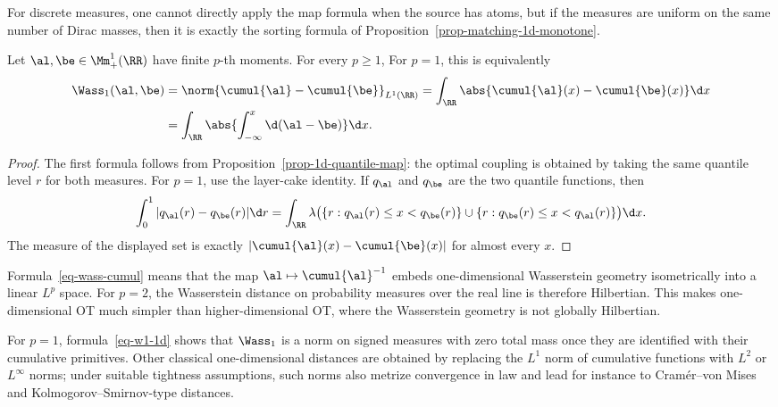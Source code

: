 For discrete measures, one cannot directly apply the map formula when the source has atoms, but if the measures are uniform on the same number of Dirac masses, then it is exactly the sorting formula of Proposition~\ref{prop-matching-1d-monotone}.

\begin{prop}\label{prop-wass-quantile-1d}
	Let $\al,\be\in\Mm_+^1(\RR)$ have finite $p$-th moments. For every $p\geq1$,
	For $p=1$, this is equivalently
	\begin{align}\label{eq-w1-1d}
		\Wass_1(\al,\be)
		&=
		\norm{\cumul{\al}-\cumul{\be}}_{L^1(\RR)}
		=
		\int_\RR \abs{\cumul{\al}(x)-\cumul{\be}(x)}\d x \\
		&=
		\int_\RR \abs{\int_{-\infty}^x\d(\al-\be)}\d x.
	\end{align}
\end{prop}
\begin{proof}
	The first formula follows from Proposition~\ref{prop-1d-quantile-map}: the optimal coupling is obtained by taking the same quantile level $r$ for both measures. For $p=1$, use the layer-cake identity. If $q_\al$ and $q_\be$ are the two quantile functions, then
	\[
		\int_0^1 |q_\al(r)-q_\be(r)|\d r
		=
		\int_\RR
		\lambda\bigl(\{r:q_\al(r)\leq x<q_\be(r)\}\cup\{r:q_\be(r)\leq x<q_\al(r)\}\bigr)\d x.
	\]
	The measure of the displayed set is exactly $|\cumul{\al}(x)-\cumul{\be}(x)|$ for almost every $x$.
\end{proof}

Formula~\eqref{eq-wass-cumul} means that the map $\al\mapsto\cumul{\al}^{-1}$ embeds one-dimensional Wasserstein geometry isometrically into a linear $L^p$ space. For $p=2$, the Wasserstein distance on probability measures over the real line is therefore Hilbertian. This makes one-dimensional OT much simpler than higher-dimensional OT, where the Wasserstein geometry is not globally Hilbertian.

For $p=1$, formula~\eqref{eq-w1-1d} shows that $\Wass_1$ is a norm on signed measures with zero total mass once they are identified with their cumulative primitives. Other classical one-dimensional distances are obtained by replacing the $L^1$ norm of cumulative functions with $L^2$ or $L^\infty$ norms; under suitable tightness assumptions, such norms also metrize convergence in law and lead for instance to Cram\'er--von Mises and Kolmogorov--Smirnov-type distances.

